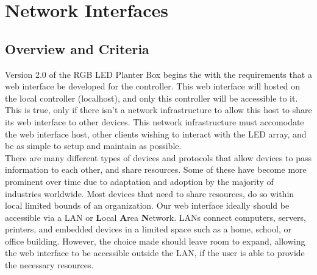 \documentclass[onecolumn, draftclsnofoot,10pt, compsoc]{IEEEtran}
\begin{document}
\newpage

\tableofcontents
\clearpage
\singlespace

\newpage





	\section{Network Interfaces}

		\subsection{Overview and Criteria}
		Version 2.0 of the RGB LED Planter Box begins the with the requirements that a web interface be developed for the controller.
		This web interface will hosted on the local controller (localhost), and only this controller will be accessible to it.
		This is true, only if there isn't a network infrastructure to allow this host to share its web interface to other devices.
	  This network infrastructure must accomodate the web interface host, other clients wishing to interact with the LED array, and
		be as simple to setup and maintain as possible.  \\

		There are many different types of devices and protocols that allow devices to pass information to each other, and share resources.
		Some of these have become more prominent over time due to adaptation and adoption by the majority of industries worldwide.
		Most devices that need to share resources, do so within local limited bounds of an organization.
		Our web interface ideally should be accessible via a LAN or \textbf{L}ocal \textbf{A}rea \textbf{N}etwork.
		LANs connect computers, servers, printers, and embedded devices in a limited space such as a home, school, or office building. \cite{LAN1}
		However, the choice made should leave room to expand, allowing the web interface to be accessible outside the LAN, if the user is able to provide the necessary resources.
\end{document}
